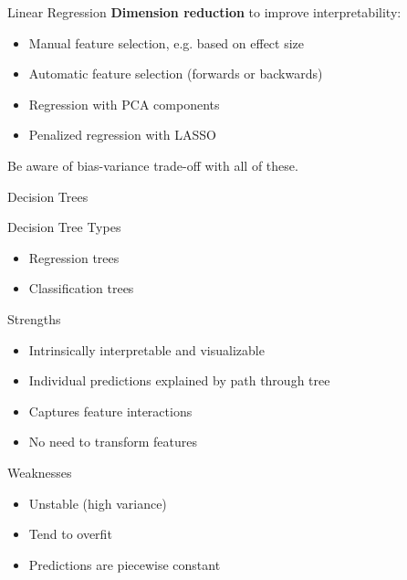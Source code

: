 \documentclass[ignorenonframetext,xcolor=x11names]{beamer}
\begin{document}
\begin{frame}[fragile]{Linear Regression}
\textbf{Dimension reduction} to improve interpretability:
\begin{itemize}
   \item Manual feature selection, e.g. based on effect size
   \item Automatic feature selection (forwards or backwards)
   \item Regression with PCA components
   \item Penalized regression with LASSO
\end{itemize} 

Be aware of bias-variance trade-off with all of these. \\

\end{frame}


\begin{frame}{Decision Trees}

\begin{block}{Decision Tree Types}
\begin{itemize}
\item Regression trees
\item Classification trees
\end{itemize}
\end{block}

\begin{block}{Strengths}
\begin{itemize}
   \item Intrinsically interpretable and visualizable
   \item Individual predictions explained by path through tree
   \item Captures feature interactions
   \item No need to transform features
\end{itemize}
\end{block}

\begin{block}{Weaknesses}
\begin{itemize}
   \item Unstable (high variance)
   \item Tend to overfit
   \item Predictions are piecewise constant
\end{itemize}
\end{block}

\end{frame}
\end{document}
